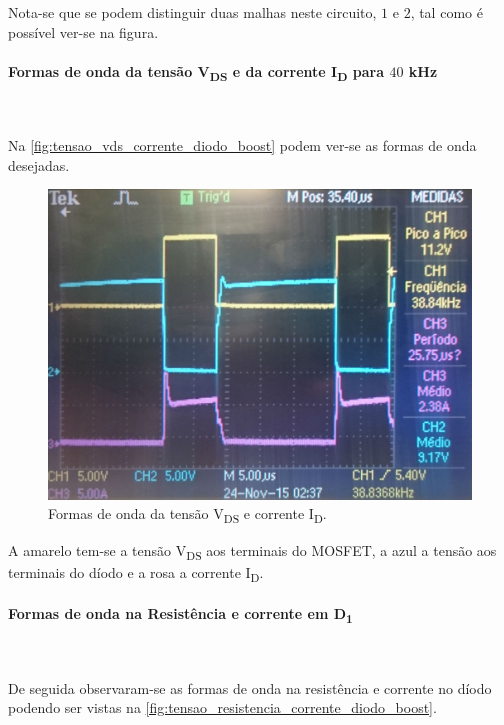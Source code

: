 \documentclass[a4paper,11pt]{article}
\numberwithin{equation}{section}
\begin{document}
Nota-se que se podem distinguir duas malhas neste circuito, $1$ e $2$, tal como é possível ver-se na figura.

\paragraph{Formas de onda da tensão V\textsubscript{DS} e da corrente I\textsubscript{D} para $40$ kHz}\mbox{}\

Na \autoref{fig:tensao_vds_corrente_diodo_boost} podem ver-se as formas de onda desejadas.

\begin{figure}[H]
	\centering
	\includegraphics[keepaspectratio=true, scale=0.13]{img/figs/tensao_vds_corrente_diodo_boost}
	\caption{Formas de onda da tensão V\textsubscript{DS} e corrente I\textsubscript{D}.}
	\label{fig:tensao_vds_corrente_diodo_boost}
	\vspace{-0.8em}
\end{figure}

A amarelo tem-se a tensão V\textsubscript{DS} aos terminais do MOSFET, a azul a tensão aos terminais do díodo e a rosa a corrente I\textsubscript{D}.

\paragraph{Formas de onda na Resistência e corrente em D\textsubscript{1}}\mbox{}\

De seguida observaram-se as formas de onda na resistência e corrente no díodo podendo ser vistas na \autoref{fig:tensao_resistencia_corrente_diodo_boost}.
\end{document}
